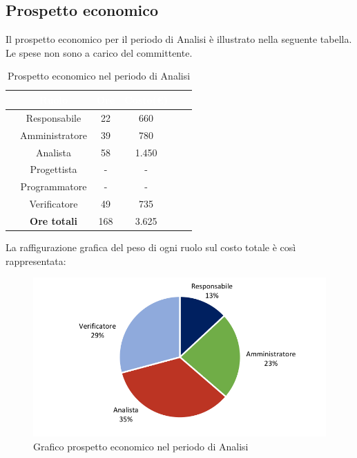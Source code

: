 \subsection{Prospetto economico}
Il prospetto economico per il periodo di Analisi è illustrato nella seguente tabella.
Le spese non sono a carico del committente.

\begin{table}[ht]
	\begin{center}
			\begin{tabular}{cccccc}
			\rowcolor{coolblack}
			\hline
			&\textcolor{white}{Ruolo}&	\textcolor{white}{Ore} &\textcolor{white}{Costo(\euro)} \\
			\hline
			&Responsabile           &22& 660  \\
			&Amministratore        & 39& 780 \\
			&Analista                   & 58& 1.450 \\
			&Progettista              &  -& - \\
			&Programmatore       & - & -  \\
			&Verificatore             & 49 & 735 \\
			\hline
			&\textbf{Ore totali}    &168& 3.625 \\
		\end{tabular}
		\caption{Prospetto economico nel periodo di Analisi}
	\end{center}
\end{table}

La raffigurazione grafica del peso di ogni ruolo sul costo totale è così rappresentata:
\begin{figure}[!ht]
	\centering
	\includegraphics{images/grafoProspettoEconomico.png}
	\caption{Grafico prospetto economico nel periodo di Analisi }
\end{figure}


